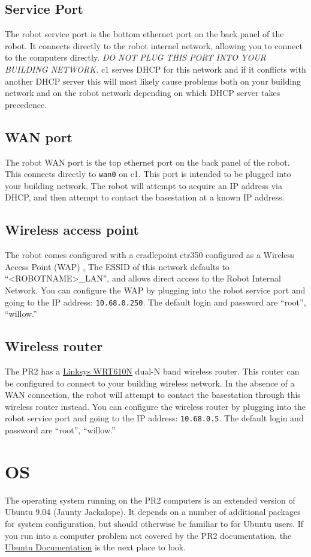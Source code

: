 \subsection{Service Port} The robot service port is the bottom
ethernet port on the back panel of the robot.  It connects directly to
the robot internel network, allowing you to connect to the computers
directly.  \textit{DO NOT PLUG THIS PORT INTO YOUR BUILDING NETWORK.}
c1 serves DHCP for this network and if it conflicts with another DHCP
server this will most likely cause problems both on your building
network and on the robot network depending on which DHCP server takes
precedence.
\subsection{WAN port} The robot WAN port is the top ethernet port on
the back panel of the robot.  This connects directly to \texttt{wan0}
on c1.  This port is intended to be plugged into your building
network.  The robot will attempt to acquire an IP address via DHCP,
and then attempt to contact the basestation at a known IP address.
\subsection{Wireless access point} The robot comes configured with a
cradlepoint ctr350 configured as a Wireless Access Point (WAP)
\href{http://www.cradlepoint.com/products/ctr350-mobile-broadband-router}.
The ESSID of this network defaults to ``<ROBOTNAME>\_LAN'', and allows
direct access to the Robot Internal Network.  You can configure the
WAP by plugging into the robot service port and going to the IP
address: \texttt{10.68.0.250}.  The default login and password are
``root'', ``willow.''

\subsection{Wireless router}
The PR2 has a
\href{http://www.linksysbycisco.com/US/en/products/WRT610N}{Linksys
  WRT610N} dual-N band wireless router.  This router can be configured
to connect to your building wireless network.  In the absence of a WAN
connection, the robot will attempt to contact the basestation through
this wireless router instead. You can configure the wireless router by
plugging into the robot service port and going to the IP address:
\texttt{10.68.0.5}.  The default login and password are ``root'',
``willow.''

\section{OS}
The operating system running on the PR2 computers is an extended
version of Ubuntu 9.04 (Jaunty Jackalope). It depends on a number of
additional packages for system configuration, but should otherwise be
familiar to for Ubuntu users. If you run into a computer problem not
covered by the PR2 documentation, the
\href{https://help.ubuntu.com/9.04/index.html}{Ubuntu Documentation}
is the next place to look.

